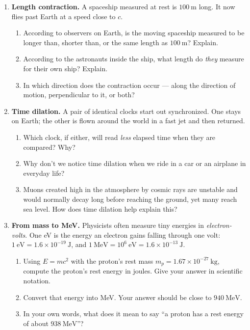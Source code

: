 \documentclass[12pt, twoside]{article}
\begin{document}
\begin{enumerate}[itemsep=0.5cm]
\newpage
\item \textbf{Length contraction.} A spaceship measured at rest is $100~\text{m}$ long. It now flies past Earth at a speed close to $c$.
  \begin{enumerate}[itemsep=2cm]
    \item According to observers on Earth, is the moving spaceship measured to be longer than, shorter than, or the same length as $100~\text{m}$? Explain.
    \item According to the astronauts inside the ship, what length do \emph{they} measure for their own ship? Explain.
    \item In which direction does the contraction occur --- along the direction of motion, perpendicular to it, or both?
  \end{enumerate}
  \vspace{0.4cm}

\item \textbf{Time dilation.} A pair of identical clocks start out synchronized. One stays on Earth; the other is flown around the world in a fast jet and then returned.
  \begin{enumerate}[itemsep=1.8cm]
    \item Which clock, if either, will read \emph{less} elapsed time when they are compared? Why?
    \item Why don't we notice time dilation when we ride in a car or an airplane in everyday life?
    \item Muons created high in the atmosphere by cosmic rays are unstable and would normally decay long before reaching the ground, yet many reach sea level. How does time dilation help explain this?
  \end{enumerate}

\newpage
\item \textbf{From mass to MeV.} Physicists often measure tiny energies in \emph{electron-volts}. One eV is the energy an electron gains falling through one volt: $1~\text{eV} = 1.6\times10^{-19}~\text{J}$, and $1~\text{MeV} = 10^{6}~\text{eV} = 1.6\times10^{-13}~\text{J}$.

  \begin{enumerate}[itemsep=1.2cm]
    \item Using $E = mc^{2}$ with the proton's rest mass $m_p = 1.67\times10^{-27}~\text{kg}$, compute the proton's rest energy in joules. Give your answer in scientific notation.
    \item Convert that energy into MeV. Your answer should be close to $940~\text{MeV}$.
    \item In your own words, what does it mean to say ``a proton has a rest energy of about $938~\text{MeV}$''?
  \end{enumerate}
  \vspace{0.2cm}


\end{enumerate}
\end{document}
